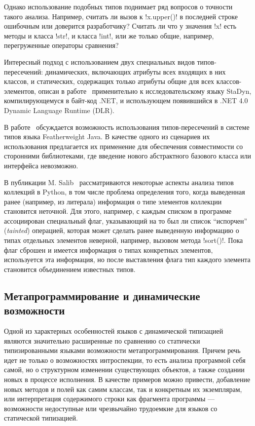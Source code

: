 Однако использование подобных типов поднимает ряд вопросов о точности такого
анализа. Например, считать ли вызов к !x.upper()! в последней
строке ошибочным или доверится разработчику? Считать ли что у значения
!x! есть методы и класса !str!, и класса !int!, или же только общие, например,
перегруженные операторы сравнения?

Интересный подход с использованием двух специальных видов типов-пересечений:
динамических, включающих атрибуты всех входящих в них классов, и статических,
содержащих только атрибуты общие для всех классов-элементов, описан в
работе~\cite{Ortin2011:union} применительно к исследовательскому языку StaDyn,
компилирующемуся в байт-код .NET, и использующем появившийся в .NET 4.0 Dynamic
Language Runtime (DLR).


В работе~\cite{Igarashi2006} обсуждается возможность использования
типов-пересечений в системе типов языка Featherweight Java. В качестве одного из
сценариев их использования предлагается их применение для обеспечения
совместимости со сторонними библиотеками, где введение нового абстрактного
базового класса или интерфейса невозможно.  

В публикации M. Salib~\cite{Salib2004} рассматриваются некоторые аспекты анализа
типов коллекций в Python, в том числе проблема определения того, когда
выведенная ранее (например, из литерала) информация о типе элементов коллекции
становится неточной. Для этого, например, с каждым списком в программе ассоциирован
специальный флаг, указывающий на то был ли список ``испорчен'' (\emph{tainted})
операцией, которая может сделать ранее выведенную информацию о типах отдельных
элементов неверной, например, вызовом метода !sort()!. Пока флаг сброшен и имеется
информация о типах конкретных элементов, используется эта информация, но после
выставления флага тип каждого элемента становится объединением известных типов.

\subsection{Метапрограммирование и динамические возможности}

Одной из характерных особенностей языков с динамической типизацией являются
значительно расширенные по сравнению со статически типизированными языками
возможности метапрограммирования. Причем речь идет не только о возможностях
интроспекции, то есть анализа программой себя самой, но о
структурном изменении существующих объектов, а также создании новых
в процессе исполнения. В качестве примеров можно привести, добавление новых
методов и полей как самим классам, так и конкретным их экземплярам, или
интерпретация содержимого строки как фрагмента программы --- возможности
недоступные или чрезвычайно трудоемкие для языков со статической типизацией.

